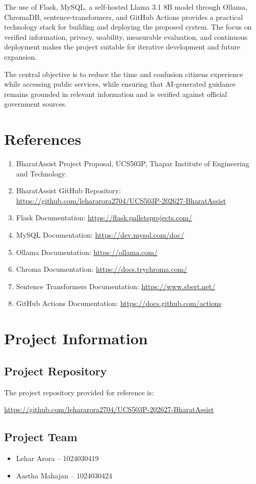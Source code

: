 \documentclass[12pt,a4paper]{report}
\begin{document}
The use of Flask, MySQL, a self-hosted Llama 3.1 8B model through Ollama, ChromaDB, sentence-transformers, and GitHub Actions provides a practical technology stack for building and deploying the proposed system. The focus on verified information, privacy, usability, measurable evaluation, and continuous deployment makes the project suitable for iterative development and future expansion.

The central objective is to reduce the time and confusion citizens experience while accessing public services, while ensuring that AI-generated guidance remains grounded in relevant information and is verified against official government sources.

\chapter*{References}

\begin{enumerate}[leftmargin=*]
    \item BharatAssist Project Proposal, UCS503P, Thapar Institute of Engineering and Technology.
    \item BharatAssist GitHub Repository:
    \url{https://github.com/lehararora2704/UCS503P-202627-BharatAssist}
    \item Flask Documentation: \url{https://flask.palletsprojects.com/}
    \item MySQL Documentation: \url{https://dev.mysql.com/doc/}
    \item Ollama Documentation: \url{https://ollama.com/}
    \item Chroma Documentation: \url{https://docs.trychroma.com/}
    \item Sentence Transformers Documentation: \url{https://www.sbert.net/}
    \item GitHub Actions Documentation: \url{https://docs.github.com/actions}
\end{enumerate}

\appendix
\chapter{Project Information}

\section{Project Repository}

The project repository provided for reference is:

\url{https://github.com/lehararora2704/UCS503P-202627-BharatAssist}

\section{Project Team}

\begin{itemize}[leftmargin=*]
    \item Lehar Arora -- 1024030419
    \item Aastha Mahajan -- 1024030424
\end{itemize}
\end{document}
